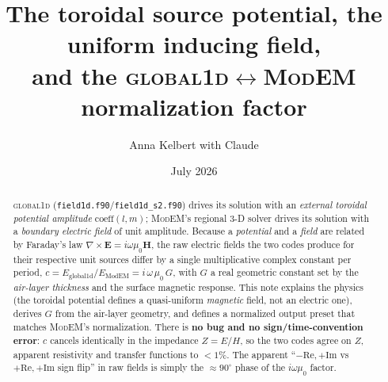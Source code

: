\documentclass[11pt]{article}
\title{The toroidal source potential, the uniform inducing field,\\
and the \textsc{global1d}$\leftrightarrow$\textsc{ModEM} normalization factor}
\author{Anna Kelbert with Claude}
\date{July 2026}
\newcommand{\Emodem}{E_{\mathrm{ModEM}}}
\newcommand{\Eg}{E_{\mathrm{global1d}}}
\begin{document}
\maketitle

\begin{abstract}
\textsc{global1d} (\texttt{field1d.f90}/\texttt{field1d\_s2.f90}) drives its solution with an
\emph{external toroidal potential amplitude} $\mathrm{coeff}(l,m)$; \textsc{ModEM}'s regional 3-D
solver drives its solution with a \emph{boundary electric field} of unit amplitude. Because a
\emph{potential} and a \emph{field} are related by Faraday's law $\nabla\times\mathbf E=i\omega\mu_0
\mathbf H$, the raw electric fields the two codes produce for their respective unit sources differ by
a single multiplicative complex constant per period, $c=\Eg/\Emodem=i\,\omega\,\mu_0\,G$, with $G$ a
real geometric constant set by the \emph{air-layer thickness} and the surface magnetic response. This
note explains the physics (the toroidal potential defines a quasi-uniform \emph{magnetic} field, not
an electric one), derives $G$ from the air-layer geometry, and defines a normalized output preset
that matches \textsc{ModEM}'s normalization. There is \textbf{no bug and no sign/time-convention
error}: $c$ cancels identically in the impedance $Z=E/H$, so the two codes agree on $Z$, apparent
resistivity and transfer functions to $<1\%$. The apparent ``$-\mathrm{Re},+\mathrm{Im}$ vs
$+\mathrm{Re},+\mathrm{Im}$ sign flip'' in raw fields is simply the ${\approx}90^\circ$ phase of the
$i\omega\mu_0$ factor.
\end{abstract}
\end{document}
